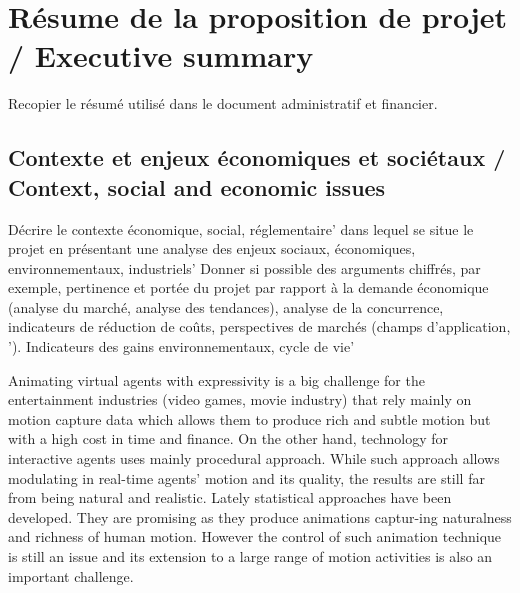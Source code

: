 \section{R\'esume de la proposition de projet / Executive summary}

\begin{xcomment}  
Recopier le r\'esum\'e utilis\'e dans le document administratif et financier.
\end{xcomment}








\subsection{Contexte et enjeux \'economiques et soci\'etaux / Context, social and economic issues}
\begin{xcomment}  
D\'ecrire le contexte \'economique, social, r\'eglementaire' dans lequel se situe le projet en pr\'esentant une analyse des enjeux sociaux, \'economiques, environnementaux, industriels' Donner si possible des arguments chiffr\'es, par exemple, pertinence et port\'ee du projet par rapport à la demande \'economique (analyse du march\'e, analyse des tendances), analyse de la concurrence, indicateurs de r\'eduction de coûts, perspectives de march\'es (champs d'application, '). Indicateurs des gains environnementaux, cycle de vie'
\end{xcomment}

Animating virtual agents with expressivity is a big challenge for the entertainment industries (video games, movie industry) that rely mainly on motion capture data which allows them to produce rich and subtle motion but with a high cost in time and finance. On the other hand, technology for interactive agents uses mainly procedural approach. While such approach allows modulating in real-time agents' motion and its quality, the results are still far from being natural and realistic. Lately statistical approaches have been developed. They are promising as they produce animations captur-ing naturalness and richness of human motion. However the control of such animation technique is still an issue and its extension to a large range of motion activities is also an important challenge.


